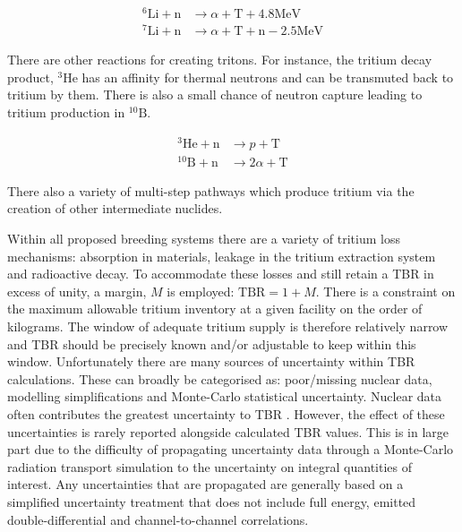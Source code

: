 \begin{equation}
\begin{split}
  ^{6}\mathrm{Li} + \mathrm{n} & \rightarrow \alpha + \mathrm{T} + 4.8\mathrm{MeV} \\
  ^{7}\mathrm{Li} + \mathrm{n} & \rightarrow \alpha + \mathrm{T} + \mathrm{n} - 2.5\mathrm{MeV}
\end{split}
\end{equation}

There are other reactions for creating tritons. For instance, the tritium decay product, $^{3}\mathrm{He}$ has an affinity for thermal neutrons and can be transmuted back to tritium by them. There is also a small chance of neutron capture leading to tritium production in $^{10}\mathrm{B}$.

\begin{equation}
\begin{split}
  ^{3}\mathrm{He} + \mathrm{n} & \rightarrow p + \mathrm{T} \\
  ^{10}\mathrm{B} + \mathrm{n} & \rightarrow 2\alpha + \mathrm{T}
\end{split}
\end{equation}

There also a variety of multi-step pathways which produce tritium via the creation of other intermediate nuclides. 


Within all proposed breeding systems there are a variety of tritium loss mechanisms: absorption in materials, leakage in the tritium extraction system and radioactive decay. To accommodate these losses and still retain a TBR in excess of unity, a margin, $M$ is employed: $\mathrm{TBR} = 1 + M$. There is a constraint on the maximum allowable tritium inventory at a given facility on the order of kilograms. The window of adequate tritium supply is therefore relatively narrow and TBR should be precisely known and/or adjustable to keep within this window. Unfortunately there are many sources of uncertainty within TBR calculations. These can broadly be categorised as: poor/missing nuclear data, modelling simplifications and Monte-Carlo statistical uncertainty. Nuclear data often contributes the greatest uncertainty to TBR \cite{El-Guebaly2009}. However, the effect of these uncertainties is rarely reported alongside calculated TBR values. This is in large part due to the difficulty of propagating uncertainty data through a Monte-Carlo radiation transport simulation to the uncertainty on integral quantities of interest. Any uncertainties that are propagated are generally based on a simplified uncertainty treatment that does not include full energy, emitted double-differential and channel-to-channel correlations. 

